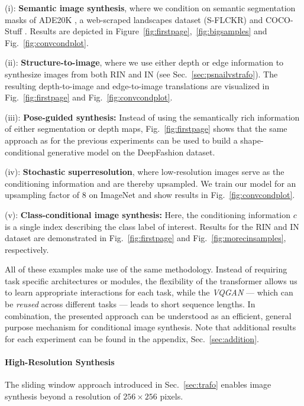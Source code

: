  (i): \textbf{Semantic image synthesis}, where we condition on semantic segmentation masks of ADE20K \cite{zhou2016semantic}, a web-scraped landscapes dataset (S-FLCKR) and COCO-Stuff \cite{caesar2018cvpr}. Results are depicted in Figure~\ref{fig:firstpage},~\ref{fig:bigsamples} and Fig.~\ref{fig:convcondplot}.

 (ii): \textbf{Structure-to-image}, where we use either depth or edge information to synthesize images from both RIN and IN (see
Sec.~\ref{sec:psnailvstrafo}). The resulting depth-to-image and edge-to-image translations are visualized in Fig.~\ref{fig:firstpage} and Fig.~\ref{fig:convcondplot}.

 (iii): \textbf{Pose-guided synthesis:} Instead of using the semantically rich information of either segmentation or depth maps, Fig.~\ref{fig:firstpage}
shows that the same approach as for the previous experiments can be used to build a shape-conditional generative model on the DeepFashion \cite{liuLQWTcvpr16DeepFashion} dataset.

\enlargethispage{1\baselineskip}
 (iv): \textbf{Stochastic superresolution}, where low-resolution images serve as the conditioning information and are thereby upsampled. We train our model for an upsampling factor of 8 on ImageNet and show results in
Fig.~\ref{fig:convcondplot}. 

 (v): \textbf{Class-conditional image synthesis:} Here, the conditioning information $c$ is a single index describing the class label of interest. Results for the RIN and IN dataset are demonstrated in Fig.~\ref{fig:firstpage} and Fig.~\ref{fig:morecinsamples}, respectively. 

 All of these examples make use of the same methodology. Instead of requiring task specific architectures or modules, the flexibility of the transformer allows us to learn appropriate interactions for each task, while the
\emph{VQGAN} --- which can be \emph{reused}
across different tasks --- leads to short sequence lengths. In combination, the presented approach can be understood as an efficient, general purpose mechanism for conditional image synthesis. Note that additional results for each experiment can be found in the appendix, Sec.~\ref{sec:addition}.

\paragraph{High-Resolution Synthesis} The sliding window approach introduced in Sec.~\ref{sec:trafo}
enables image synthesis beyond a resolution of $256 \times 256$ pixels.

